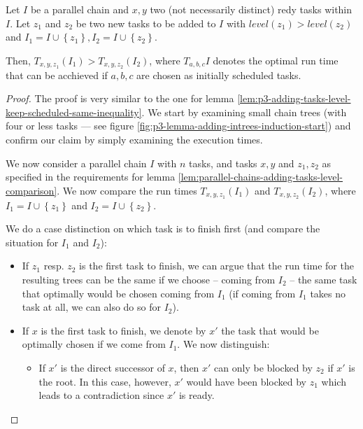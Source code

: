 \begin{lemma}
  \label{lem:parallel-chains-adding-tasks-level-comparison}
  Let $I$ be a parallel chain and $x, y$ two (not necessarily distinct) redy tasks within $I$. Let $z_1$ and $z_2$ be two new tasks to be added to $I$ with $level(z_1) > level(z_2)$ and $I_1=I\cup\left\{ z_1 \right\}, I_2=I\cup\left\{ z_2 \right\}$.
  
  Then, $T_{x,y,z_1}(I_1) > T_{x,y,z_2}(I_2)$, where $T_{a,b,c}{I}$ denotes the optimal run time that can be acchieved if $a,b,c$ are chosen as initially scheduled tasks.
\end{lemma}

\begin{proof}
  The proof is very similar to the one for lemma \ref{lem:p3-adding-tasks-level-keep-scheduled-same-inequality}. We start by examining small chain trees (with four or less tasks --- see figure \ref{fig:p3-lemma-adding-intrees-induction-start}) and confirm our claim by simply examining the execution times.
  
  We now consider a parallel chain $I$ with $n$ tasks, and tasks $x,y$ and $z_1, z_2$ as specified in the requirements for lemma \ref{lem:parallel-chains-adding-tasks-level-comparison}. We now compare the run times $T_{x,y,z_1}(I_1)$ and $T_{x,y,z_2}(I_2)$, where $I_1=I\cup\left\{ z_1 \right\}$ and $I_2=I\cup\left\{z_2  \right\}$.

  We do a case distinction on which task is to finish first (and compare the situation for $I_1$ and $I_2$):
  \begin{itemize}
  \item If $z_1$ resp. $z_2$ is the first task to finish, we can argue that the run time for the resulting trees can be the same if we choose -- coming from $I_2$ -- the same task that optimally would be chosen coming from $I_1$ (if coming from $I_1$ takes no task at all, we can also do so for $I_2$). 
  \item If $x$ is the first task to finish, we denote by $x'$ the task that would be optimally chosen if we come from $I_1$. We now distinguish:
    \begin{itemize}
    \item If $x'$  is the direct successor of $x$, then $x'$ can only be blocked by $z_2$ if $x'$ is the root. In this case, however, $x'$ would have been blocked by $z_1$ which leads to a contradiction since $x'$ is ready.


\end{itemize}
\end{itemize}
\end{proof}
